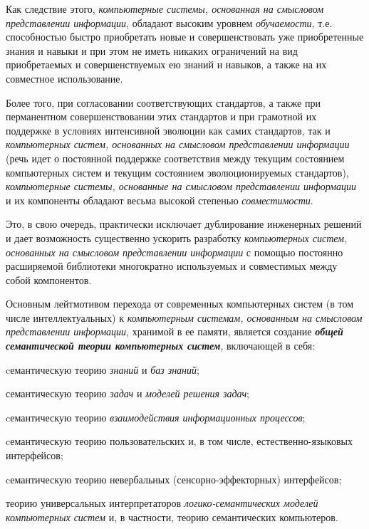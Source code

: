 \begin{SCn}
\begin{scnsubstruct}
{	Как следствие этого, \textit{компьютерные системы, основанная на смысловом представлении информации}, обладают высоким уровнем \textit{обучаемости}, т.е. способностью быстро приобретать новые и совершенствовать уже приобретенные знания и навыки и при этом не иметь никаких ограничений на вид приобретаемых и совершенствуемых ею знаний и навыков, а также на их совместное использование.
	
	Более того, при согласовании соответствующих стандартов, а также при перманентном совершенствовании этих стандартов и при грамотной их поддержке в условиях интенсивной эволюции как самих стандартов, так и \textit{компьютерных систем, основанных на смысловом представлении информации} (речь идет о постоянной поддержке соответствия между текущим состоянием компьютерных систем и текущим состоянием эволюционируемых стандартов), \textit{компьютерные системы, основанные на смысловом представлении информации} и их компоненты обладают весьма высокой степенью \textit{совместимости}.
	
	Это, в свою очередь, практически исключает дублирование инженерных решений и дает возможность существенно ускорить разработку \textit{компьютерных систем, основанных на смысловом представлении информации} с помощью постоянно расширяемой библиотеки многократно используемых и совместимых между собой компонентов. 
	
	Основным лейтмотивом перехода от современных компьютерных систем (в том числе интеллектуальных) к \textit{компьютерным системам, основанным на смысловом представлении информации}, хранимой в ее памяти, является создание \textbf{\textit{общей семантической теории компьютерных систем}}, включающей в себя:
	\begin{scnitemize}
		\item cемантическую теорию \textit{знаний} и \textit{баз знаний};
		\item семантическую теорию \textit{задач} и \textit{моделей решения задач};
		\item cемантическую теорию \textit{взаимодействия информационных процессов};
		\item cемантическую теорию пользовательских и, в том числе, естественно-языковых интерфейсов;
		\item cемантическую теорию невербальных (сенсорно-эффекторных) интерфейсов;
		\item теорию универсальных интерпретаторов \textit{логико-семантических моделей компьютерных систем} и, в частности, теорию семантических компьютеров.
	\end{scnitemize}
	
}
\end{scnsubstruct}
\end{SCn}
